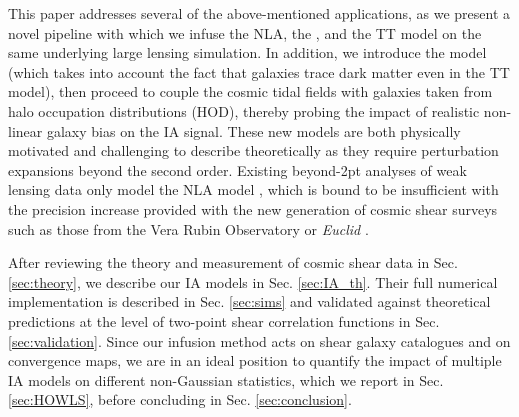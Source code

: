 This paper addresses several of the above-mentioned applications, as we present a novel  pipeline with which we infuse the NLA, the \dNLA, and the TT model on the same underlying large lensing simulation. 
In addition, we introduce the \dTT model (which takes into account the fact that galaxies trace dark matter even in the TT model), then proceed to couple the cosmic tidal fields with galaxies taken from halo occupation distributions (HOD), thereby probing the impact of realistic non-linear galaxy bias on the IA signal. These new models are both physically motivated and challenging to describe theoretically as they require perturbation expansions beyond the second order.  Existing  beyond-2pt analyses of weak lensing data only model the NLA model \citep{DESY3_Zuercher, HD21}, which is bound to be insufficient with the precision increase provided with the new generation of cosmic shear surveys such as those from the Vera Rubin Observatory \citep{LSST-Design} or {\it Euclid} \citep{RedBook}. 

After reviewing the theory and measurement of cosmic shear data in Sec. \ref{sec:theory}, we describe our IA models in Sec. \ref{sec:IA_th}.  
Their full numerical implementation is described in Sec. \ref{sec:sims} and validated against theoretical predictions at the level of  two-point shear correlation functions in Sec. \ref{sec:validation}.
Since our infusion method acts on shear galaxy catalogues and on convergence maps, we are in an ideal position to quantify the impact of multiple IA models on different non-Gaussian statistics, which we report in Sec. \ref{sec:HOWLS}, before concluding in Sec. \ref{sec:conclusion}. 